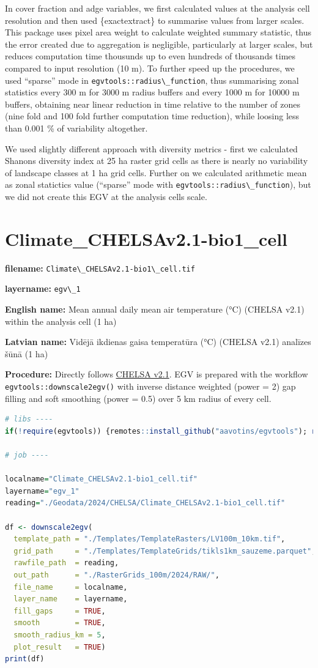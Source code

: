 \documentclass[
]{book}
\newcommand{\passthrough}[1]{#1}
\begin{document}
In cover fraction and adge variables, we first calculated values at the analysis
cell resolution and then used \{exactextract\} to summarise values from larger scales.
This package uses pixel area weight to calculate weighted summary statistic, thus the
error created due to aggregation is negligible, particularly at larger scales, but
reduces computation time thousunds up to even hundreds of thousands times compared
to input resolution (10 m). To further speed up the procedures, we used ``sparse''
mode in \passthrough{\lstinline!egvtools::radius\_function!}, thus summarising zonal statistics every 300 m for
3000 m radius buffers and every 1000 m for 10000 m buffers, obtaining near linear
reduction in time relative to the number of zones (nine fold and 100 fold further
computation time reduction), while loosing less than 0.001 \% of variability altogether.

We used slightly different approach with diversity metrics - first we calculated
Shanons diversity index at 25 ha raster grid cells as there is nearly no variability
of landscape classes at 1 ha grid cells. Further on we calculated arithmetic mean as
zonal statictics value (``sparse'' mode with \passthrough{\lstinline!egvtools::radius\_function!}), but we
did not create this EGV at the analysis cells scale.

\section{Climate\_CHELSAv2.1-bio1\_cell}\label{ch06.001}

\textbf{filename:} \passthrough{\lstinline!Climate\_CHELSAv2.1-bio1\_cell.tif!}

\textbf{layername:} \passthrough{\lstinline!egv\_1!}

\textbf{English name:} Mean annual daily mean air temperature (°C) (CHELSA v2.1) within the analysis cell (1 ha)

\textbf{Latvian name:} Vidējā ikdienas gaisa temperatūra (°C) (CHELSA v2.1) analīzes šūnā (1 ha)

\textbf{Procedure:} Directly follows \hyperref[Ch04.11]{CHELSA v2.1}. EGV is prepared with the
workflow \passthrough{\lstinline!egvtools::downscale2egv()!} with inverse distance weighted (power = 2)
gap filling and soft smoothing (power = 0.5) over 5 km radius of every cell.

\begin{lstlisting}[language=R]
# libs ----
if(!require(egvtools)) {remotes::install_github("aavotins/egvtools"); require(egvtools)}

# job ----

localname="Climate_CHELSAv2.1-bio1_cell.tif"
layername="egv_1"
reading="./Geodata/2024/CHELSA/Climate_CHELSAv2.1-bio1_cell.tif"

df <- downscale2egv(
  template_path = "./Templates/TemplateRasters/LV100m_10km.tif",
  grid_path     = "./Templates/TemplateGrids/tikls1km_sauzeme.parquet",
  rawfile_path  = reading,
  out_path      = "./RasterGrids_100m/2024/RAW/",
  file_name     = localname,
  layer_name    = layername,
  fill_gaps     = TRUE,
  smooth        = TRUE,
  smooth_radius_km = 5,
  plot_result   = TRUE)
print(df)
\end{lstlisting}
\end{document}
